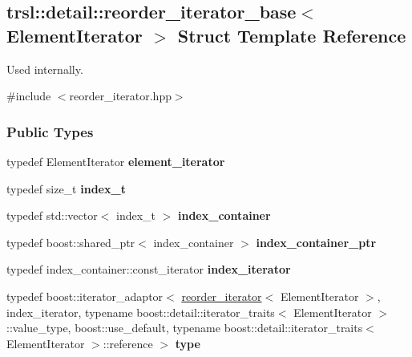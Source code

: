 \hypertarget{structtrsl_1_1detail_1_1reorder__iterator__base}{
\subsection{trsl::detail::reorder\_\-iterator\_\-base$<$ ElementIterator $>$ Struct Template Reference}
\label{structtrsl_1_1detail_1_1reorder__iterator__base}
}


Used internally.  


{\ttfamily \#include $<$reorder\_\-iterator.hpp$>$}\subsubsection*{Public Types}
\begin{DoxyCompactItemize}
\item 
\hypertarget{structtrsl_1_1detail_1_1reorder__iterator__base_a2466cf8895daf2d722f265a1598ed2f3}{
typedef ElementIterator {\bfseries element\_\-iterator}}
\label{structtrsl_1_1detail_1_1reorder__iterator__base_a2466cf8895daf2d722f265a1598ed2f3}

\item 
\hypertarget{structtrsl_1_1detail_1_1reorder__iterator__base_a81b1ec284aa7e3f339b32efcf6fa3045}{
typedef size\_\-t {\bfseries index\_\-t}}
\label{structtrsl_1_1detail_1_1reorder__iterator__base_a81b1ec284aa7e3f339b32efcf6fa3045}

\item 
\hypertarget{structtrsl_1_1detail_1_1reorder__iterator__base_a52b417c426365f190bd440bf3da5ffe3}{
typedef std::vector$<$ index\_\-t $>$ {\bfseries index\_\-container}}
\label{structtrsl_1_1detail_1_1reorder__iterator__base_a52b417c426365f190bd440bf3da5ffe3}

\item 
\hypertarget{structtrsl_1_1detail_1_1reorder__iterator__base_a14830cd2b05e39dfc3c105367e33da2e}{
typedef boost::shared\_\-ptr$<$ index\_\-container $>$ {\bfseries index\_\-container\_\-ptr}}
\label{structtrsl_1_1detail_1_1reorder__iterator__base_a14830cd2b05e39dfc3c105367e33da2e}

\item 
\hypertarget{structtrsl_1_1detail_1_1reorder__iterator__base_a9b11223ea8913fdd753aa14a9de9db48}{
typedef index\_\-container::const\_\-iterator {\bfseries index\_\-iterator}}
\label{structtrsl_1_1detail_1_1reorder__iterator__base_a9b11223ea8913fdd753aa14a9de9db48}

\item 
\hypertarget{structtrsl_1_1detail_1_1reorder__iterator__base_a95d3bc0c21ee4f68e3c08783c9ba9ec2}{
typedef boost::iterator\_\-adaptor$<$ \hyperlink{classtrsl_1_1reorder__iterator}{reorder\_\-iterator}$<$ ElementIterator $>$, index\_\-iterator, typename boost::detail::iterator\_\-traits$<$ ElementIterator $>$::value\_\-type, boost::use\_\-default, typename boost::detail::iterator\_\-traits$<$ ElementIterator $>$::reference $>$ {\bfseries type}}
\label{structtrsl_1_1detail_1_1reorder__iterator__base_a95d3bc0c21ee4f68e3c08783c9ba9ec2}

\end{DoxyCompactItemize}


